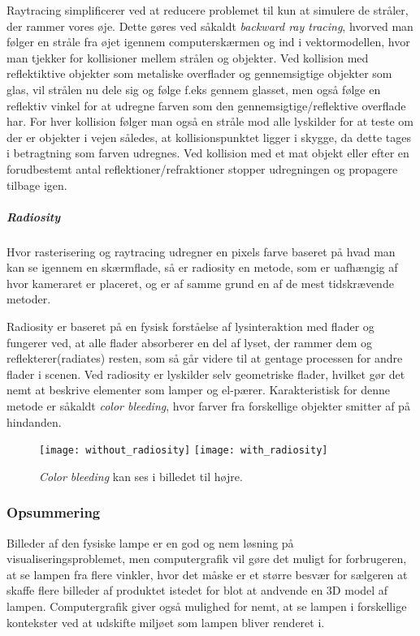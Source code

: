 Raytracing simplificerer ved at reducere problemet til kun at simulere de stråler, der rammer vores øje. Dette gøres ved såkaldt \textit{backward ray tracing}, hvorved man følger en stråle fra øjet igennem computerskærmen og ind i vektormodellen, hvor man tjekker for kollisioner mellem strålen og objekter. Ved kollision med reflektiktive objekter som metaliske overflader og gennemsigtige objekter som glas, vil strålen nu dele sig og følge f.eks gennem glasset, men også følge en reflektiv vinkel for at udregne farven som den gennemsigtige/reflektive overflade har. For hver kollision følger man også en stråle mod alle lyskilder for at teste om der er objekter i vejen således, at kollisionspunktet ligger i skygge, da dette tages i betragtning som farven udregnes. Ved kollision med et mat objekt eller efter en forudbestemt antal reflektioner/refraktioner stopper udregningen og propagere tilbage igen.

\subparagraph{Radiosity \cite{radiosity_by_wpi,radiosity_by_uob}}
Hvor rasterisering og raytracing udregner en pixels farve baseret på hvad man kan se igennem en skærmflade, så er radiosity en metode, som er uafhængig af hvor kameraret er placeret, og er af samme grund en af de mest tidskrævende metoder. 

Radiosity er baseret på en fysisk forståelse af lysinteraktion med flader og fungerer ved, at alle flader absorberer en del af lyset, der rammer dem og reflekterer(radiates) resten, som så går videre til at gentage processen for andre flader i scenen. Ved radiosity er lyskilder selv geometriske flader, hvilket gør det nemt at beskrive elementer som lamper og el-pærer. Karakteristisk for denne metode er såkaldt \textit{color bleeding}, hvor farver fra forskellige objekter smitter af på hindanden.
\begin{figure}[H]
    \centering
    \texttt{[image: without\_radiosity]}
    \texttt{[image: with\_radiosity]}
    \caption{\textit{Color bleeding} kan ses i billedet til højre.}
    \label{fig:colorbleeding}
\end{figure}

\subsubsection{Opsummering}
Billeder af den fysiske lampe er en god og nem løsning på visualiseringsproblemet, men computergrafik vil gøre det muligt for forbrugeren, at se lampen fra flere vinkler, hvor det måske er et større besvær for sælgeren at skaffe flere billeder af produktet istedet for blot at andvende en 3D model af lampen. Computergrafik giver også mulighed for nemt, at se lampen i forskellige kontekster ved at udskifte miljøet som lampen bliver renderet i. 

